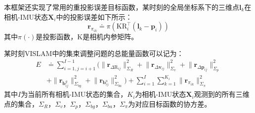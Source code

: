 本框架还实现了常用的重投影误差目标函数，某时刻的全局坐标系下的三维点$\bm{l}_k$在相机-IMU状态$\bm{X}_i$中的投影误差如下所示：
\begin{equation}
    \bm{r}_{\pi_{ik}} \doteq \pi
    \left( \mathrm{K} \mathrm{R}^\top_i (\bm{l}_k - \bm{p}_i) \right)
\end{equation}
其中$\pi(\cdot)$是投影函数，$\mathrm{K}$是相机内参矩阵。

某时刻VISLAM中的集束调整问题的总能量函数可以记为：
\begin{equation}
\begin{aligned}
    E &\doteq
      \sum_{i=1,j=i+1}^{I-1}
      \Big(
          \lVert \bm{r}_{\Delta\mathrm{R}_{ij}} \rVert^2_{\Sigma_R} +
          \lVert \bm{r}_{\Delta\bm{v}_{ij}} \rVert^2_{\Sigma_v} +
          \lVert \bm{r}_{\Delta\bm{p}_{ij}} \rVert^2_{\Sigma_p} \\
      &+  \lVert \bm{r}_{\bm{b}^g_{ij}} \rVert^2_{\Sigma_{bg}} +
          \lVert \bm{r}_{\bm{b}^a_{ij}} \rVert^2_{\Sigma_{ba}}
      \Big) +
      \sum_{i=1}^{I} \sum_{k=1}^{K_i}
      \lVert \bm{r}_{\pi_{ik}} \rVert^2_{\Sigma_\pi}
\end{aligned}
\end{equation}
其中$I$为当前所有相机-IMU状态的集合，$K_i$为相机-IMU状态$\bm{X}_i$观测到的所有三维点的集合，$\Sigma_R$，$\Sigma_v$，$\Sigma_p$，$\Sigma_{bg}$，$\Sigma_{ba}$，$\Sigma_\pi$为对应目标函数的协方差。
